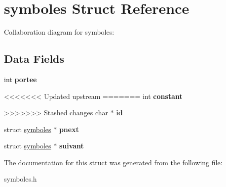 \hypertarget{structsymboles}{}\section{symboles Struct Reference}
\label{structsymboles}


Collaboration diagram for symboles\+:
\subsection*{Data Fields}
\begin{DoxyCompactItemize}
\item 
\mbox{\label{structsymboles_a8acd5efd1a635a1173215f53ae15e7fb}} 
int {\bfseries portee}
\item 
<<<<<<< Updated upstream
=======
\mbox{\label{structsymboles_ac347bb44c6dc857729453831c5714f84}} 
int {\bfseries constant}
\item 
>>>>>>> Stashed changes
\mbox{\label{structsymboles_aecb3b0d045ada529257a2fbf8f829599}} 
char $\ast$ {\bfseries id}
\item 
\mbox{\label{structsymboles_ae5a917e10d2aea4d16dac81c9556c73c}} 
struct \hyperlink{structsymboles}{symboles} $\ast$ {\bfseries pnext}
\item 
\mbox{\label{structsymboles_a4099297665249f509ea61361ce4a1a73}} 
struct \hyperlink{structsymboles}{symboles} $\ast$ {\bfseries suivant}
\end{DoxyCompactItemize}


The documentation for this struct was generated from the following file\+:\begin{DoxyCompactItemize}
\item 
symboles.\+h\end{DoxyCompactItemize}
